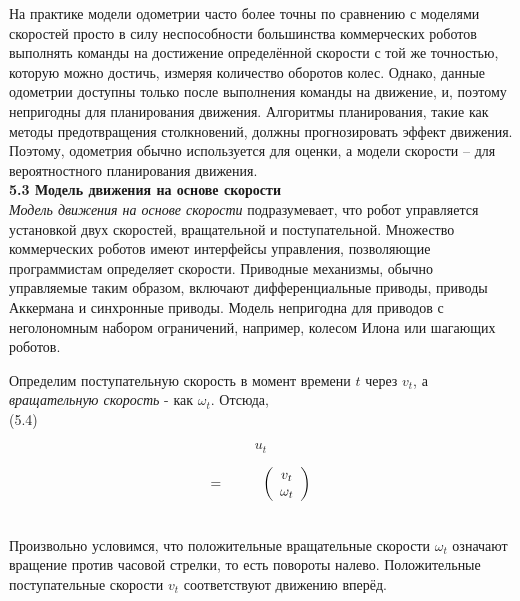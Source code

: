 \documentclass[10pt,a4paper]{article}
\begin{document}
На практике модели одометрии часто более точны по сравнению с моделями скоростей просто в силу неспособности большинства коммерческих роботов  выполнять команды на достижение определённой скорости с той же точностью, которую можно достичь, измеряя количество оборотов колес. Однако, данные одометрии доступны только после выполнения команды на движение, и, поэтому непригодны для планирования движения. Алгоритмы планирования, такие как методы предотвращения столкновений, должны прогнозировать эффект движения. Поэтому, одометрия обычно используется для оценки, а модели скорости – для вероятностного планирования движения.\\

\textbf{5.3 Модель движения на основе скорости}\\

\textit{Модель движения на основе скорости} подразумевает, что робот управляется установкой двух скоростей, вращательной и поступательной. Множество коммерческих роботов имеют интерфейсы управления, позволяющие программистам определяет скорости. Приводные механизмы, обычно управляемые таким образом, включают дифференциальные приводы, приводы Аккермана и синхронные приводы. Модель непригодна для приводов с неголономным набором ограничений, например, колесом Илона или шагающих роботов. 

Определим поступательную скорость в момент времени $t$ через $v_t$, а \textit{вращательную скорость} - как $\omega_t$. Отсюда,\\

(5.4)
\begin{minipage}{0.1\textwidth}
	\begin{equation*}
u_t
	\end{equation*}
\end{minipage}
\begin{minipage}{0.1\textwidth}
	\begin{equation*}
	\mbox {=} \hspace{10mm} 
	\left(\begin{array}{c}
	v_t\\
\omega_t\\
	\end{array}\right)
	\end{equation*}
\end{minipage}\\

Произвольно условимся, что положительные вращательные скорости $\omega_t$ означают вращение против часовой стрелки, то есть повороты налево. Положительные поступательные скорости $v_t$ соответствуют движению вперёд.\\
\end{document}
